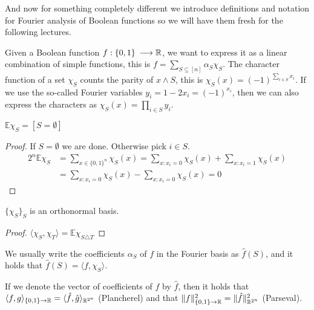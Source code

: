 \documentclass[a4paper,twoside,justified]{tufte-handout}
\begin{document}
And now for something completely different we introduce definitions and notation for Fourier analysis of Boolean functions so we will have them fresh for the following lectures.

Given a Boolean function $f:\{0,1\}\:\longrightarrow \mathbb{R}$, we want to express it as a linear combination of simple functions, this is $f = \sum_{S \subseteq [n]} \alpha_S \chi_S$. The character function of a set $\chi_S$ counts the parity of $x \land S$, this is $\chi_S(x) = (-1)^{\sum_{i\in S} x_i}$. If we use the so-called Fourier variables $y_i = 1-2x_i = (-1)^{x_i}$, then we can also express the characters as $\chi_S(x) = \prod_{i\in S} y_i$.

\begin{lemma}
  $\mathbb{E} \chi_S = [S=\emptyset]$
\end{lemma}
\begin{proof}
  If $S=\emptyset$ we are done. Otherwise pick $i\in S$.
\begin{align}
2^n \mathbb{E} \chi_S &=
\sum_{x \in \{0,1\}^n} \chi_S(x) = 
\sum_{x : x_i = 0} \chi_S(x) + \sum_{x : x_i = 1} \chi_S(x) \\ &= 
\sum_{x : x_i = 0} \chi_S(x) - \sum_{x : x_i = 0} \chi_S(x) = 0
\end{align}
\end{proof}

\begin{lemma}
  $\{\chi_S\}_S$ is an orthonormal basis.
\end{lemma}
\begin{proof}
  $\langle \chi_S, \chi_T \rangle = \mathbb{E}\chi_{S \triangle T}$
\end{proof}

We usually write the coefficients $\alpha_S$ of $f$ in the Fourier basis as $\hat{f}(S)$, and it holds that $\hat{f}(S) = \langle f,\chi_S \rangle$.

If we denote the vector of coefficients of $f$ by $\hat f$, then it holds that $\langle f,g \rangle_{\{0,1\}\to\mathbb{R}} = \langle \hat f, \hat g \rangle_{\mathbb{R}^{2^n}}$ (Plancherel) and that $\|f\|_{\{0,1\}\to\mathbb{R}}^2=\|\hat f\|_{\mathbb{R}^{2^n}}^2$ (Parseval).



\end{document}
